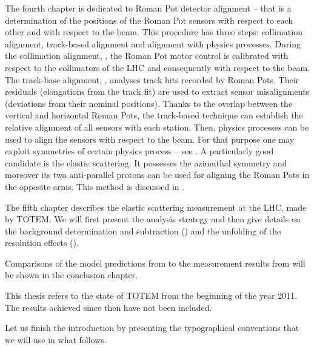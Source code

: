 The fourth chapter is dedicated to Roman Pot detector alignment -- that is a determination of the positions of the Roman Pot sensors with respect to each other and with respect to the beam. This procedure has three steps: collimation alignment, track-based alignment and alignment with physics processes. During the collimation alignment, , the Roman Pot motor control is calibrated with respect to the collimators of the LHC and consequently with respect to the beam. The track-base alignment, , analyses track hits recorded by Roman Pots. Their residuals (elongations from the track fit) are used to extract sensor misalignments (deviations from their nominal positions). Thanks to the overlap between the vertical and horizontal Roman Pots, the track-based technique can establish the relative alignment of all sensors with each station. Then, physics processes can be used to align the sensors with respect to the beam. For that purpose one may exploit symmetries of certain physics process -- see . A particularly good candidate is the elastic scattering. It possesses the azimuthal symmetry and moreover its two anti-parallel protons can be used for aligning the Roman Pots in the opposite arms. This method is discussed in .

The fifth chapter describes the elastic scattering measurement at the LHC, made by TOTEM. We will first present the analysis strategy and then give details on the background determination and subtraction () and the unfolding of the resolution effects ().

Comparisons of the model predictions from  to the measurement results from  will be shown in the conclusion chapter.

This thesis refers to the state of TOTEM from the beginning of the year 2011. The results achieved since then have not been included.


Let us finish the introduction by presenting the typographical conventions that we will use in what follows.

\centerline{\vbox{}}




\def\CaptionPrefix{\currentChapterNumber.}
